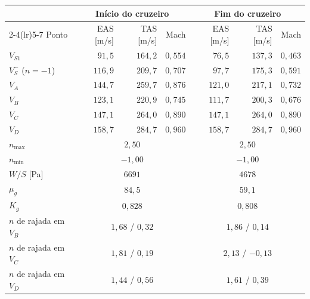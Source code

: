 \begin{tabular}{l rrr rrr}
\toprule
 & \multicolumn{3}{c}{Início do cruzeiro} & \multicolumn{3}{c}{Fim do cruzeiro} \\
\cmidrule(lr){2-4}\cmidrule(lr){5-7}
Ponto & EAS [m/s] & TAS [m/s] & Mach & EAS [m/s] & TAS [m/s] & Mach \\
\midrule
$V_{S1}$ & $91{,}5$ & $164{,}2$ & $0{,}554$ & $76{,}5$ & $137{,}3$ & $0{,}463$ \\
$V_{S}^{-}$ ($n=-1$) & $116{,}9$ & $209{,}7$ & $0{,}707$ & $97{,}7$ & $175{,}3$ & $0{,}591$ \\
$V_A$ & $144{,}7$ & $259{,}7$ & $0{,}876$ & $121{,}0$ & $217{,}1$ & $0{,}732$ \\
$V_B$ & $123{,}1$ & $220{,}9$ & $0{,}745$ & $111{,}7$ & $200{,}3$ & $0{,}676$ \\
$V_C$ & $147{,}1$ & $264{,}0$ & $0{,}890$ & $147{,}1$ & $264{,}0$ & $0{,}890$ \\
$V_D$ & $158{,}7$ & $284{,}7$ & $0{,}960$ & $158{,}7$ & $284{,}7$ & $0{,}960$ \\
\midrule
$n_{\max}$ & \multicolumn{3}{c}{$2{,}50$} & \multicolumn{3}{c}{$2{,}50$} \\
$n_{\min}$ & \multicolumn{3}{c}{$-1{,}00$} & \multicolumn{3}{c}{$-1{,}00$} \\
$W/S$ [Pa] & \multicolumn{3}{c}{$6691$} & \multicolumn{3}{c}{$4678$} \\
$\mu_g$ & \multicolumn{3}{c}{$84{,}5$} & \multicolumn{3}{c}{$59{,}1$} \\
$K_g$ & \multicolumn{3}{c}{$0{,}828$} & \multicolumn{3}{c}{$0{,}808$} \\
$n$ de rajada em $V_B$ & \multicolumn{3}{c}{$1{,}68$ / $0{,}32$} & \multicolumn{3}{c}{$1{,}86$ / $0{,}14$} \\
$n$ de rajada em $V_C$ & \multicolumn{3}{c}{$1{,}81$ / $0{,}19$} & \multicolumn{3}{c}{$2{,}13$ / $-0{,}13$} \\
$n$ de rajada em $V_D$ & \multicolumn{3}{c}{$1{,}44$ / $0{,}56$} & \multicolumn{3}{c}{$1{,}61$ / $0{,}39$} \\
\bottomrule
\end{tabular}
